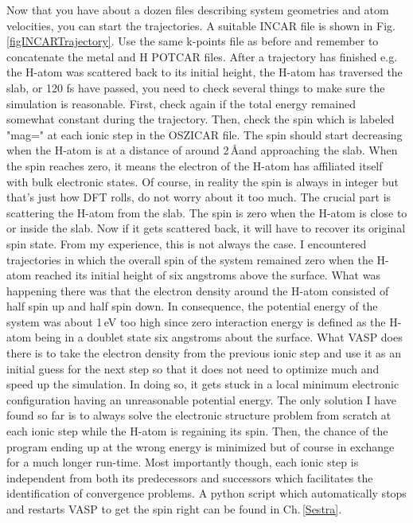 \documentclass[twoside, 11pt, titlepage, captions=nooneline, a4paper, headsepline]{scrbook}%
\newcommand{\9}{\mathrm}
\newcommand{\0}{\,\mathrm}
\begin{document}
Now that you have about a dozen files describing system geometries and atom velocities, you can start the trajectories. A suitable INCAR file is shown in Fig.\,\ref{figINCARTrajectory}. Use the same k-points file as before and remember to concatenate the metal and H POTCAR files. After a trajectory has finished e.g. the H-atom was scattered back to its initial height, the H-atom has traversed the slab, or 120 fs have passed, you need to check several things to make sure the simulation is reasonable. First, check again if the total energy remained somewhat constant during the trajectory. Then, check the spin which is labeled "mag=" at each ionic step in the OSZICAR file. The spin should start decreasing when the H-atom is at a distance of around 2\,\AA and approaching the slab. When the spin reaches zero, it means the electron of the H-atom has affiliated itself with bulk electronic states. Of course, in reality the spin is always in integer but that's just how DFT rolls, do not worry about it too much. The crucial part is scattering the H-atom from the slab. The spin is zero when the H-atom is close to or inside the slab. Now if it gets scattered back, it will have to recover its original spin state. From my experience, this is not always the case. I encountered trajectories in which the overall spin of the system remained zero when the H-atom reached its initial height of six angstroms above the surface. What was happening there was that the electron density around the H-atom consisted of half spin up and half spin down. In consequence, the potential energy of the system was about 1\,eV too high since zero interaction energy is defined as the H-atom being in a doublet state six angstroms about the surface. What VASP does there is to take the electron density from the previous ionic step and use it as an initial guess for the next step so that it does not need to optimize much and speed up the simulation. In doing so, it gets stuck in a local minimum electronic configuration having an unreasonable potential energy. The only solution I have found so far is to always solve the electronic structure problem from scratch at each ionic step while the H-atom is regaining its spin. Then, the chance of the program ending up at the wrong energy is minimized but of course in exchange for a much longer run-time. Most importantly though, each ionic step is independent from both its predecessors and successors which facilitates the identification of convergence problems. A python script which automatically stops and restarts VASP to get the spin right can be found in Ch.\,\ref{Sestra}.
\end{document}
